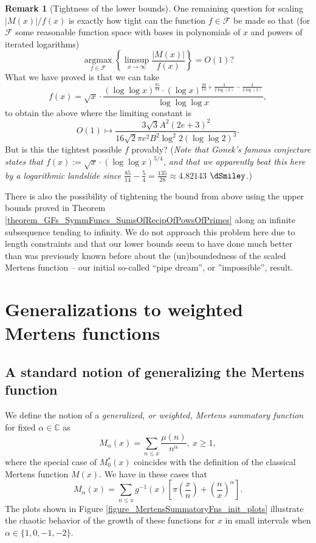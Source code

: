 \documentclass[11pt,reqno,a4letter]{article}
\numberwithin{figure}{section}
\numberwithin{table}{section}
\theoremstyle{plain}
\numberwithin{theorem}{section}
\theoremstyle{definition}
\newtheorem{remark}[theorem]{Remark}
\begin{document}
\begin{remark}[Tightness of the lower bounds] 
One remaining question for scaling $|M(x)| / f(x)$ is exactly how tight can the function 
$f \in \mathcal{F}$ be made so that 
(for $\mathcal{F}$ some reasonable function space with bases in polynomials of $x$ and 
powers of iterated logarithms) 
\[
\operatorname{argmax}\limits_{f \in \mathcal{F}} 
     \left\{\limsup_{x \rightarrow \infty} \frac{|M(x)|}{f(x)}\right\} = O(1)? 
\] 
What we have proved is that we can take 
\[
f(x) =  \sqrt{x} \cdot \frac{(\log\log x)^{\frac{85}{14}} \cdot 
     (\log x)^{\frac{29}{14}+\frac{3}{2 \log (2)}-\frac{3}{2 \log (3)}}}{\log\log\log x}, 
\]
to obtain the above where the limiting constant is 
$$O(1) \mapsto \frac{3\sqrt{3} A^2(2e+3)^2}{16 \sqrt{2} \pi e^2 B^2 \log^2 2 (\log\log 2)^{3}}.$$ 
But is this the tightest possible $f$ provably? 
(\textit{Note that Gonek's famous conjecture states that $f(x) := \sqrt{x} \cdot (\log\log x)^{5/4}$, and 
that we apparently beat this here by a logarithmic landslide since 
$\frac{85}{14} - \frac{5}{4} = \frac{135}{28} \approx 4.82143$ $\dSmiley$.}) 

There is also the possibility of tightening the bound from above using the upper bounds proved in 
Theorem \ref{theorem_GFs_SymmFuncs_SumsOfRecipOfPowsOfPrimes} 
along an infinite subsequence tending to infinity. We do not approach this problem here 
due to length constraints and that our lower bounds seem to have done much better than was 
previously known before about the (un)boundedness of the scaled Mertens function -- our initial 
so-called ``pipe dream'', or ''impossible'', result.  
\end{remark} 

\newpage
\section{Generalizations to weighted Mertens functions}

\subsection{A standard notion of generalizing the Mertens function} 

We define the notion of a 
\emph{generalized, or weighted, Mertens summatory function} for fixed 
$\alpha \in \mathbb{C}$ as 
\begin{equation} 
\label{eqn_MAlphaAstx_WeightedClassicalMertensFuncs_def_v1} 
M_{\alpha}(x) = \sum_{n \leq x} \frac{\mu(n)}{n^{\alpha}},\ x \geq 1, 
\end{equation} 
where the special case of $M_0^{\ast}(x)$ 
coincides with the definition of the classical Mertens function $M(x)$. 
We have in these cases that 
\begin{equation} 
\label{eqn_GenMertensFuncs_MAlphax_def_v2} 
M_{\alpha}(x) = \sum_{n \leq x} g^{-1}(x) \left[\pi\left(\frac{x}{n}\right) + 
     \left(\frac{n}{x}\right)^{\alpha}\right]. 
\end{equation} 
The plots shown in Figure \ref{figure_MertensSummatoryFns_init_plots} 
illustrate the chaotic behavior of the growth of these 
functions for $x$ in small intervals when $\alpha \in \{1, 0, -1, -2\}$. 
\end{document}
